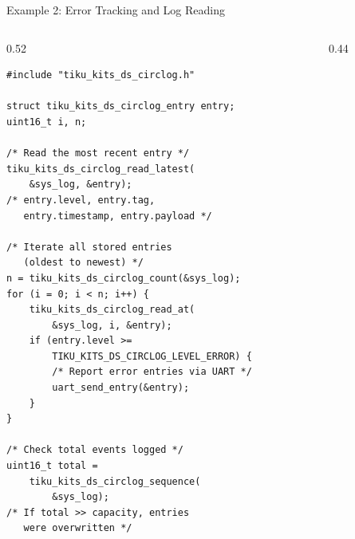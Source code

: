 \documentclass[aspectratio=169, 10pt]{beamer}
\begin{document}
\begin{frame}[fragile]{Example 2: Error Tracking and Log Reading}
\begin{columns}[T]
\begin{column}{0.52\textwidth}
\begin{lstlisting}[style=cstyle,
  title={Read back log entries for diagnostics}]
#include "tiku_kits_ds_circlog.h"

struct tiku_kits_ds_circlog_entry entry;
uint16_t i, n;

/* Read the most recent entry */
tiku_kits_ds_circlog_read_latest(
    &sys_log, &entry);
/* entry.level, entry.tag,
   entry.timestamp, entry.payload */

/* Iterate all stored entries
   (oldest to newest) */
n = tiku_kits_ds_circlog_count(&sys_log);
for (i = 0; i < n; i++) {
    tiku_kits_ds_circlog_read_at(
        &sys_log, i, &entry);
    if (entry.level >=
        TIKU_KITS_DS_CIRCLOG_LEVEL_ERROR) {
        /* Report error entries via UART */
        uart_send_entry(&entry);
    }
}

/* Check total events logged */
uint16_t total =
    tiku_kits_ds_circlog_sequence(
        &sys_log);
/* If total >> capacity, entries
   were overwritten */
\end{lstlisting}
\end{column}

\begin{column}{0.44\textwidth}
\begin{center}
\end{center}


\end{column}
\end{columns}
\end{frame}
\end{document}
